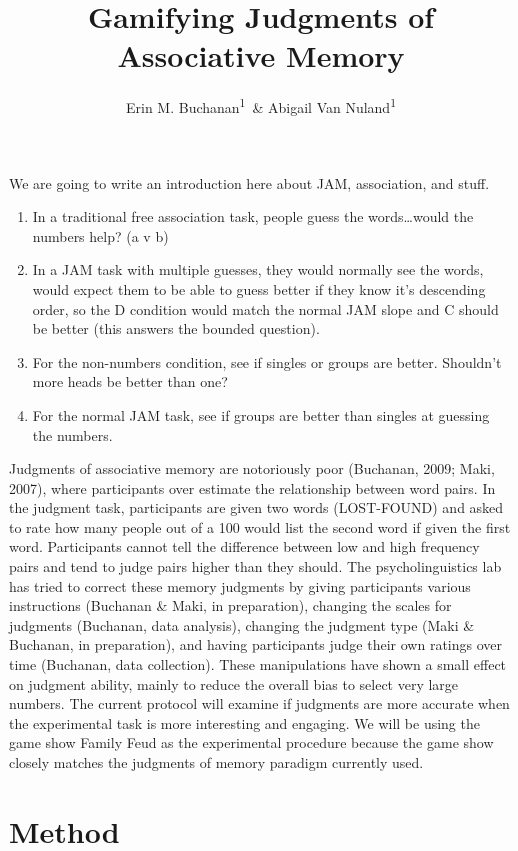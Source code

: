 \documentclass[man]{apa6}
\title{Gamifying Judgments of Associative Memory}
\author{Erin M. Buchanan\textsuperscript{1}~\& Abigail Van Nuland\textsuperscript{1}}
\date{}
\affiliation{
\vspace{0.5cm}
\textsuperscript{1} Missouri State University}
\providecommand{\tightlist}{%
  \setlength{\itemsep}{0pt}\setlength{\parskip}{0pt}}
\begin{document}
\maketitle

We are going to write an introduction here about JAM, association, and stuff.

\begin{enumerate}
\def\labelenumi{\arabic{enumi})}
\tightlist
\item
  In a traditional free association task, people guess the words\ldots{}would the numbers help? (a v b)
\item
  In a JAM task with multiple guesses, they would normally see the words, would expect them to be able to guess better if they know it's descending order, so the D condition would match the normal JAM slope and C should be better (this answers the bounded question).
\item
  For the non-numbers condition, see if singles or groups are better. Shouldn't more heads be better than one?
\item
  For the normal JAM task, see if groups are better than singles at guessing the numbers.
\end{enumerate}

Judgments of associative memory are notoriously poor (Buchanan, 2009; Maki, 2007), where participants over estimate the relationship between word pairs. In the judgment task, participants are given two words (LOST-FOUND) and asked to rate how many people out of a 100 would list the second word if given the first word. Participants cannot tell the difference between low and high frequency pairs and tend to judge pairs higher than they should. The psycholinguistics lab has tried to correct these memory judgments by giving participants various instructions (Buchanan \& Maki, in preparation), changing the scales for judgments (Buchanan, data analysis), changing the judgment type (Maki \& Buchanan, in preparation), and having participants judge their own ratings over time (Buchanan, data collection). These manipulations have shown a small effect on judgment ability, mainly to reduce the overall bias to select very large numbers. The current protocol will examine if judgments are more accurate when the experimental task is more interesting and engaging. We will be using the game show Family Feud as the experimental procedure because the game show closely matches the judgments of memory paradigm currently used.

\hypertarget{method}{%
\section{Method}\label{method}}
\end{document}
